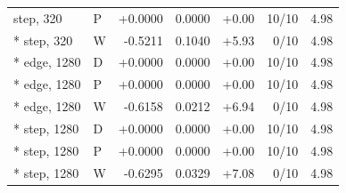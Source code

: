 \begin{longtable}{llrrrrr}
step, 320 & P & +0.0000 & 0.0000 & +0.00 & 10/10 & 4.98\\*
step, 320 & W & -0.5211 & 0.1040 & +5.93 & 0/10 & 4.98\\*
edge, 1280 & D & +0.0000 & 0.0000 & +0.00 & 10/10 & 4.98\\*
edge, 1280 & P & +0.0000 & 0.0000 & +0.00 & 10/10 & 4.98\\*
edge, 1280 & W & -0.6158 & 0.0212 & +6.94 & 0/10 & 4.98\\*
step, 1280 & D & +0.0000 & 0.0000 & +0.00 & 10/10 & 4.98\\*
step, 1280 & P & +0.0000 & 0.0000 & +0.00 & 10/10 & 4.98\\*
step, 1280 & W & -0.6295 & 0.0329 & +7.08 & 0/10 & 4.98\\
\end{longtable}

